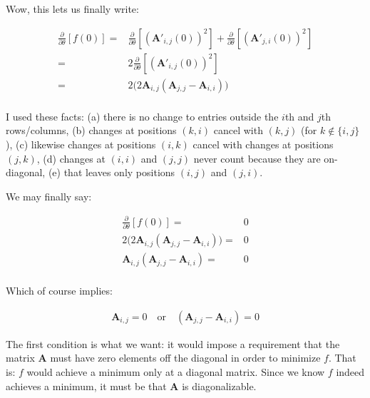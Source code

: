 \documentclass[11pt, oneside]{amsart}
\newcommand{\fpartial}[2]{\frac{\partial #1}{\partial #2}}
\newcommand{\mtx}[1]{\bm{#1}}
\newcommand{\fptheta}{\fpartial{}{\theta}}
\newcommand{\mtxA}{\mtx{A}}
\begin{document}
Wow, this lets us finally write:

\begin{equation*}
  \begin{split}
    \fptheta \left[ f(0) \right]
      ={}&
        \fptheta \left[ \left( \mtxA'_{i, j}(0) \right)^2 \right]
        + \fptheta \left[ \left( \mtxA'_{j, i}(0) \right)^2 \right] \\
      ={}&
        2 \fptheta \left[ \left( \mtxA'_{i, j}(0) \right)^2 \right] \\
      ={}&
        2 \big( 2 \mtxA_{i, j} (\mtxA_{j, j} - \mtxA_{i, i}) \big) \\
  \end{split}
\end{equation*}

I used these facts: (a) there is no change to entries outside the $i$th
and $j$th rows/columns, (b) changes at positions $(k, i)$ cancel with
$(k, j)$ (for $k \not\in \{ i, j \}$), (c) likewise changes at positions
$(i, k)$ cancel with changes at positions $(j, k)$, (d) changes at $(i,
i)$ and $(j, j)$ never count because they are on-diagonal, (e) that
leaves only positions $(i, j)$ and $(j, i)$.

We may finally say:

\begin{equation*}
  \begin{split}
    \fptheta \left[ f(0) \right]
      ={}& 0 \\
    2 \big( 2 \mtxA_{i, j} (\mtxA_{j, j} - \mtxA_{i, i}) \big)
      ={}& 0 \\
    \mtxA_{i, j} (\mtxA_{j, j} - \mtxA_{i, i})
      ={}& 0 \\
  \end{split}
\end{equation*}

Which of course implies:

\begin{equation*}
  \begin{split}
    \mtxA_{i, j} = 0
    \quad \text{or} \quad
    (\mtxA_{j, j} - \mtxA_{i, i}) = 0
  \end{split}
\end{equation*}

The first condition is what we want: it would impose a requirement that
the matrix $\mtxA$ must have zero elements off the diagonal in order to
minimize $f$. That is: $f$ would achieve a minimum only at a diagonal
matrix. Since we know $f$ indeed achieves a minimum, it must be that
$\mtxA$ is diagonalizable.
\end{document}
